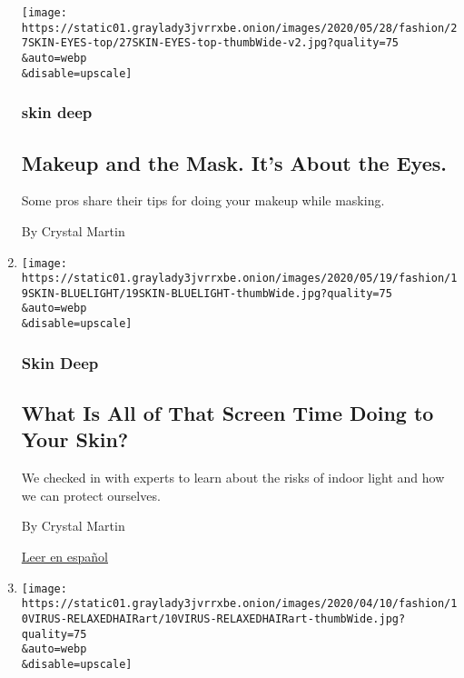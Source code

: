 \begin{enumerate}
  \texttt{[image: https://static01.graylady3jvrrxbe.onion/images/2020/05/28/fashion/27SKIN-EYES-top/27SKIN-EYES-top-thumbWide-v2.jpg?quality=75\\\&auto=webp\\\&disable=upscale]}

  \hypertarget{skin-deep-1}{%
  \subsubsection{skin deep}\label{skin-deep-1}}

  \hypertarget{makeup-and-the-mask-its-about-the-eyes}{%
  \subsection{Makeup and the Mask. It's About the
  Eyes.}\label{makeup-and-the-mask-its-about-the-eyes}}

  Some pros share their tips for doing your makeup while masking.

  By Crystal Martin
\item
  \href{/2020/05/20/style/skin-damage-blue-light-what-is-all-of-that-screen-time-doing-to-your-skin.html}{}

  \texttt{[image: https://static01.graylady3jvrrxbe.onion/images/2020/05/19/fashion/19SKIN-BLUELIGHT/19SKIN-BLUELIGHT-thumbWide.jpg?quality=75\\\&auto=webp\\\&disable=upscale]}

  \hypertarget{skin-deep-2}{%
  \subsubsection{Skin Deep}\label{skin-deep-2}}

  \hypertarget{what-is-all-of-that-screen-time-doing-to-your-skin}{%
  \subsection{What Is All of That Screen Time Doing to Your
  Skin?}\label{what-is-all-of-that-screen-time-doing-to-your-skin}}

  We checked in with experts to learn about the risks of indoor light
  and how we can protect ourselves.

  By Crystal Martin

  \href{https://www.nytimes3xbfgragh.onion/es/2020/05/26/espanol/estilos-de-vida/efectos-luz-pantalla-piel.html}{Leer
  en español}
\item
  \href{/2020/04/11/style/how-to-care-for-your-relaxed-hair-at-home.html}{}

  \texttt{[image: https://static01.graylady3jvrrxbe.onion/images/2020/04/10/fashion/10VIRUS-RELAXEDHAIRart/10VIRUS-RELAXEDHAIRart-thumbWide.jpg?quality=75\\\&auto=webp\\\&disable=upscale]}


\end{enumerate}
